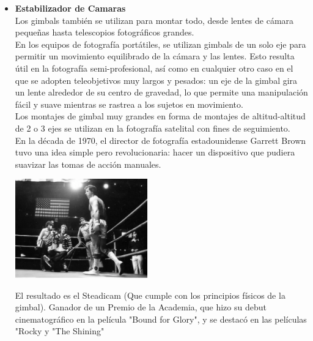 \begin{itemize}
	\item \textbf{Estabilizador de Camaras}\\
	      Los gimbals también se utilizan para montar todo, desde lentes de cámara pequeñas
	      hasta telescopios fotográficos grandes.\\
	      En los equipos de fotografía portátiles, se utilizan gimbals de un
	      solo eje para permitir un movimiento equilibrado de la cámara y las lentes.
	      Esto resulta útil en la fotografía semi-profesional, así como en cualquier otro
	      caso en el que se adopten teleobjetivos muy largos y pesados: un eje de la gimbal
	      gira un lente alrededor de su centro de gravedad, lo que permite una manipulación
	      fácil y suave mientras se rastrea a los sujetos en movimiento.\\
	      Los montajes de gimbal muy grandes en forma de montajes de altitud-altitud de 2 o 3 ejes
	      se utilizan en la fotografía satelital con fines de seguimiento.\\
	      En la década de 1970, el director de fotografía estadounidense Garrett Brown tuvo
	      una idea simple pero revolucionaria: hacer un dispositivo que pudiera suavizar las
	      tomas de acción manuales.
	      \begin{center}
		      \includegraphics[width=0.45\textwidth]{Contenido/Cuerpo/Capitulo1/Fig4.eps}
		      \label{fig:Introduccion:Fig5}
	      \end{center}

	      El resultado es el Steadicam (Que cumple con los principios físicos de la gimbal).
	      Ganador de un Premio de la Academia, que hizo su debut cinematográfico en la
	      película "Bound for Glory", y se destacó en las películas "Rocky y "The Shining"


\end{itemize}

